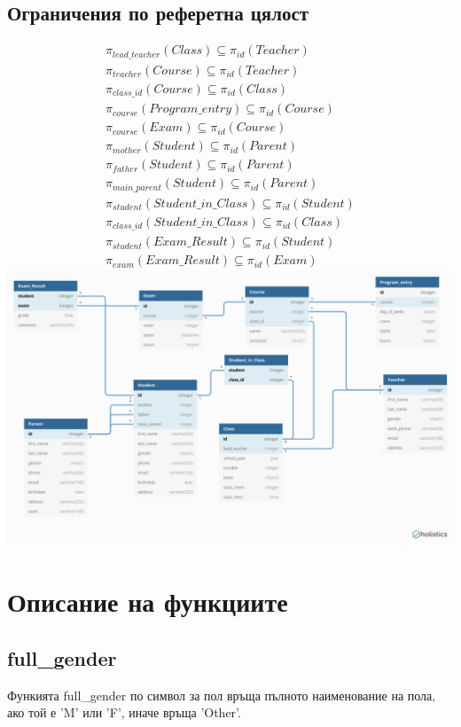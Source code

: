 \documentclass[a4paper, 12pt, x11names]{article}
\begin{document}
\subsection{Ограничения по реферетна цялост}
\begin{align*}
    \pi_{lead\_teacher}(Class) \subseteq \pi_{id}(Teacher) \\
    \pi_{teacher}(Course) \subseteq \pi_{id}(Teacher) \\
    \pi_{class\_id}(Course) \subseteq \pi_{id}(Class) \\
    \pi_{course}(Program\_entry) \subseteq \pi_{id}(Course) \\
    \pi_{course}(Exam) \subseteq \pi_{id}(Course) \\
    \pi_{mother}(Student) \subseteq \pi_{id}(Parent) \\
    \pi_{father}(Student) \subseteq \pi_{id}(Parent) \\
    \pi_{main\_parent}(Student) \subseteq \pi_{id}(Parent) \\
    \pi_{student}(Student\_in\_Class) \subseteq \pi_{id}(Student) \\
    \pi_{class\_id}(Student\_in\_Class) \subseteq \pi_{id}(Class) \\
    \pi_{student}(Exam\_Result) \subseteq \pi_{id}(Student) \\
    \pi_{exam}(Exam\_Result) \subseteq \pi_{id}(Exam)
\end{align*}
\includegraphics[width=\textwidth]{table_diagram}
\restoregeometry{}
\section{Описание на функциите}
\subsection{full\_gender}
Функията full\_gender по символ за пол връща пълното наименование на пола, ако той е 'M' или 'F',
иначе връща 'Other'.
\end{document}
